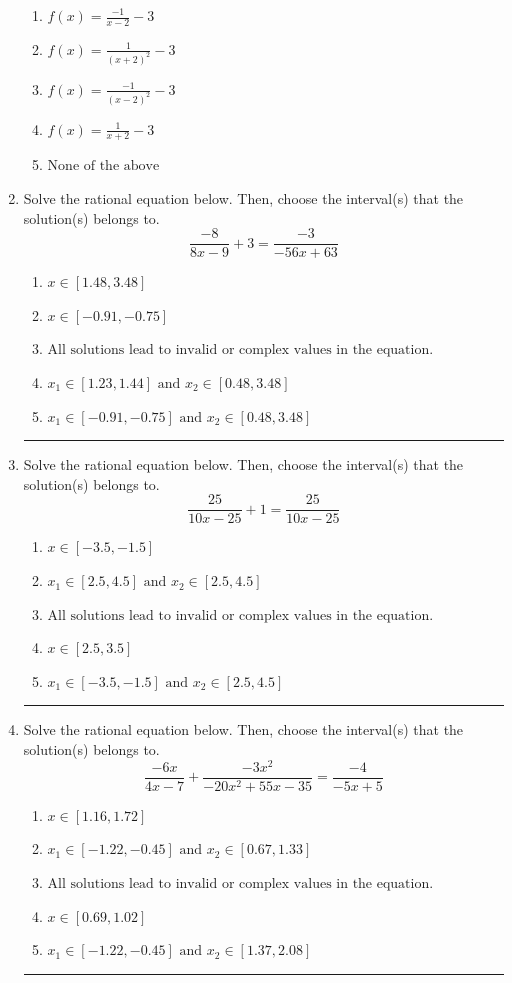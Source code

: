 \documentclass[14pt]{extbook}
\newcommand{\litem}[1]{\item#1\hspace*{-1cm}\rule{\textwidth}{0.4pt}}
\begin{document}
\begin{enumerate}
{\begin{center}
\end{center}
\begin{enumerate}[label=\Alph*.]
\item \( f(x) = \frac{-1}{x - 2} - 3 \)
\item \( f(x) = \frac{1}{(x + 2)^2} - 3 \)
\item \( f(x) = \frac{-1}{(x - 2)^2} - 3 \)
\item \( f(x) = \frac{1}{x + 2} - 3 \)
\item \( \text{None of the above} \)

\end{enumerate} }
\litem{
Solve the rational equation below. Then, choose the interval(s) that the solution(s) belongs to.\[ \frac{-8}{8x -9} + 3 = \frac{-3}{-56x + 63} \]\begin{enumerate}[label=\Alph*.]
\item \( x \in [1.48,3.48] \)
\item \( x \in [-0.91,-0.75] \)
\item \( \text{All solutions lead to invalid or complex values in the equation.} \)
\item \( x_1 \in [1.23, 1.44] \text{ and } x_2 \in [0.48,3.48] \)
\item \( x_1 \in [-0.91, -0.75] \text{ and } x_2 \in [0.48,3.48] \)

\end{enumerate} }
\litem{
Solve the rational equation below. Then, choose the interval(s) that the solution(s) belongs to.\[ \frac{25}{10x -25} + 1 = \frac{25}{10x -25} \]\begin{enumerate}[label=\Alph*.]
\item \( x \in [-3.5,-1.5] \)
\item \( x_1 \in [2.5, 4.5] \text{ and } x_2 \in [2.5,4.5] \)
\item \( \text{All solutions lead to invalid or complex values in the equation.} \)
\item \( x \in [2.5,3.5] \)
\item \( x_1 \in [-3.5, -1.5] \text{ and } x_2 \in [2.5,4.5] \)

\end{enumerate} }
\litem{
Solve the rational equation below. Then, choose the interval(s) that the solution(s) belongs to.\[ \frac{-6x}{4x -7} + \frac{-3x^{2}}{-20x^{2} +55 x -35} = \frac{-4}{-5x + 5} \]\begin{enumerate}[label=\Alph*.]
\item \( x \in [1.16,1.72] \)
\item \( x_1 \in [-1.22, -0.45] \text{ and } x_2 \in [0.67,1.33] \)
\item \( \text{All solutions lead to invalid or complex values in the equation.} \)
\item \( x \in [0.69,1.02] \)
\item \( x_1 \in [-1.22, -0.45] \text{ and } x_2 \in [1.37,2.08] \)


\end{enumerate}}
\end{enumerate}
\end{document}
